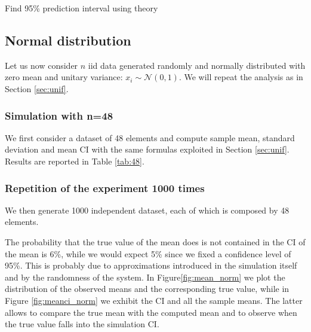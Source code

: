 \documentclass[twoside,onecolumn]{article}
\theoremstyle{definition}
\begin{document}
Find 95\% prediction interval using theory

\subsection{Normal distribution}
Let us now consider $n$ iid data generated randomly and normally distributed with zero mean and unitary variance: $x_i\sim \mathcal N (0,1)$. We will repeat the analysis as in Section \ref{sec:unif}.

\subsubsection{Simulation with n=48}
We first consider a dataset of 48 elements and compute sample mean, standard deviation and mean CI with the same formulas exploited in Section \ref{sec:unif}. Results are reported in Table \ref{tab:48}.


\subsubsection{Repetition of the experiment 1000 times}
We then generate 1000 independent dataset, each of which is composed by 48 elements. 

The probability that the true value of the mean does is not contained in the CI of the mean is 6\%, while we would expect 5\% since we fixed a confidence level of 95\%. This is probably due to approximations introduced in the simulation itself and by the randomness of the system.
In Figure\ref{fig:mean_norm} we plot the distribution of the observed means and the corresponding true value, while in Figure \ref{fig:meanci_norm} we exhibit the CI and all the sample means. The latter allows to compare the true mean with the computed mean and to observe when the true value falls into the simulation CI.
\end{document}
